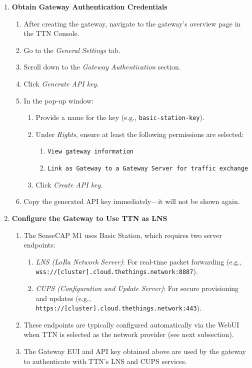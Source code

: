 \begin{enumerate}
    \item \textbf{Obtain Gateway Authentication Credentials}
          \begin{enumerate}
              \item After creating the gateway, navigate to the gateway’s overview page in the TTN Console.
              \item Go to the \textit{General Settings} tab.
              \item Scroll down to the \textit{Gateway Authentication} section.
              \item Click \textit{Generate API key}.
              \item In the pop-up window:
                    \begin{enumerate}
                        \item Provide a name for the key (e.g., \texttt{basic-station-key}).
                        \item Under \textit{Rights}, ensure at least the following permissions are selected:
                              \begin{enumerate}
                                  \item \texttt{View gateway information}
                                  \item \texttt{Link as Gateway to a Gateway Server for traffic exchange}
                              \end{enumerate}
                        \item Click \textit{Create API key}.
                    \end{enumerate}
              \item Copy the generated API key immediately—it will not be shown again.
          \end{enumerate}

    \item \textbf{Configure the Gateway to Use TTN as LNS}
          \begin{enumerate}
              \item The SenseCAP M1 uses Basic Station, which requires two server endpoints:
                    \begin{enumerate}
                        \item \textit{LNS (LoRa Network Server)}: For real-time packet forwarding (e.g., \texttt{wss://[cluster].cloud.thethings.network:8887}).
                        \item \textit{CUPS (Configuration and Update Server)}: For secure provisioning and updates (e.g., \texttt{https://[cluster].cloud.thethings.network:443}).
                    \end{enumerate}
              \item These endpoints are typically configured automatically via the WebUI when TTN is selected as the network provider (see next subsection).
              \item The Gateway EUI and API key obtained above are used by the gateway to authenticate with TTN’s LNS and CUPS services.
          \end{enumerate}
\end{enumerate}

